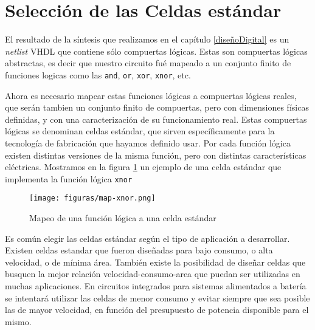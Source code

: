 \section{Selección de las Celdas estándar}\label{celdasEstandars}
El resultado de la síntesis que realizamos en el capítulo \ref{diseñoDigital} es un \emph{netlist} VHDL que contiene sólo compuertas lógicas. Estas son compuertas lógicas abstractas, es decir que nuestro circuito fué mapeado a un conjunto finito de funciones logicas como las \verb.and., \verb.or., \verb.xor., \verb.xnor., etc.

Ahora es necesario mapear estas funciones lógicas a compuertas lógicas reales, que serán tambien un conjunto finito de compuertas, pero con dimensiones físicas definidas, y con una caracterización de su funcionamiento real. Estas compuertas lógicas se denominan celdas estándar, que sirven específicamente para la tecnología de fabricación que hayamos definido usar. Por cada función lógica existen distintas versiones de la misma función, pero con distintas características eléctricas. Mostramos en la figura \ref{fig:map-xnor} un ejemplo de una celda estándar que implementa la función lógica \verb.xnor.




\begin{figure}[h]
\centering
\texttt{[image: figuras/map-xnor.png]}
  \caption{Mapeo de una función lógica a una celda estándar}
  \label{fig:map-xnor}
\end{figure}

Es común elegir las celdas estándar según el tipo de aplicación a desarrollar. Existen celdas estandar que fueron diseñadas para bajo consumo, o alta velocidad, o de mínima área. También existe la posibilidad de diseñar celdas que busquen la mejor relación velocidad-consumo-area que puedan ser utilizadas en muchas aplicaciones. En circuitos integrados para sistemas alimentados a batería se intentará utilizar las celdas de menor consumo y evitar siempre que sea posible las de mayor velocidad, en función del presupuesto de potencia disponible para el mismo.

